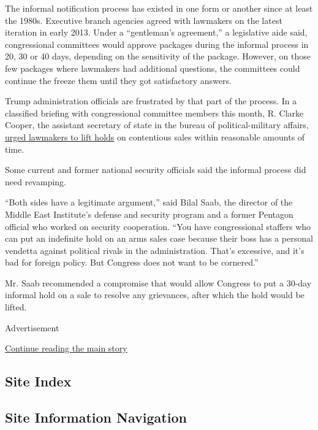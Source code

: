 The informal notification process has existed in one form or another
since at least the 1980s. Executive branch agencies agreed with
lawmakers on the latest iteration in early 2013. Under a ``gentleman's
agreement,'' a legislative aide said, congressional committees would
approve packages during the informal process in 20, 30 or 40 days,
depending on the sensitivity of the package. However, on those few
packages where lawmakers had additional questions, the committees could
continue the freeze them until they got satisfactory answers.

Trump administration officials are frustrated by that part of the
process. In a classified briefing with congressional committee members
this month, R. Clarke Cooper, the assistant secretary of state in the
bureau of political-military affairs,
\href{https://www.nytimes.com/2019/06/12/us/politics/arms-sales-saudi-arabia.html}{urged
lawmakers to lift holds} on contentious sales within reasonable amounts
of time.

Some current and former national security officials said the informal
process did need revamping.

``Both sides have a legitimate argument,'' said Bilal Saab, the director
of the Middle East Institute's defense and security program and a former
Pentagon official who worked on security cooperation. ``You have
congressional staffers who can put an indefinite hold on an arms sales
case because their boss has a personal vendetta against political rivals
in the administration. That's excessive, and it's bad for foreign
policy. But Congress does not want to be cornered.''

Mr. Saab recommended a compromise that would allow Congress to put a
30-day informal hold on a sale to resolve any grievances, after which
the hold would be lifted.

Advertisement

\protect\hyperlink{after-bottom}{Continue reading the main story}

\hypertarget{site-index}{%
\subsection{Site Index}\label{site-index}}

\hypertarget{site-information-navigation}{%
\subsection{Site Information
Navigation}\label{site-information-navigation}}

